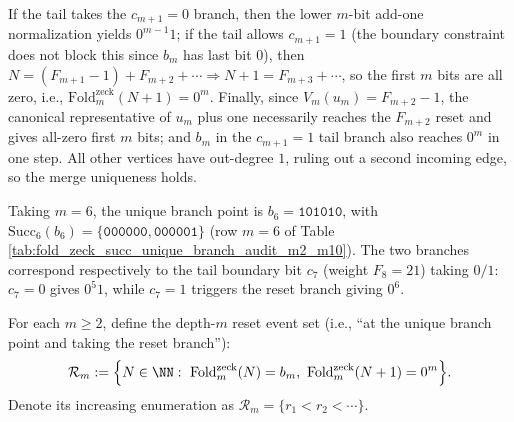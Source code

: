\begin{enumerate}
\begin{theorem}
  If the tail takes the \(c_{m+1}=0\) branch, then the lower \(m\)-bit add-one normalization yields \(0^{m-1}1\);
  if the tail allows \(c_{m+1}=1\) (the boundary constraint does not block this since \(b_m\) has last bit \(0\)), then
  \(N=(F_{m+1}-1)+F_{m+2}+\cdots\Rightarrow N+1=F_{m+3}+\cdots\), so the first \(m\) bits are all zero, i.e., \(\mathrm{Fold}^{\mathrm{zeck}}_m(N+1)=0^m\).
  Finally, since \(V_m(u_m)=F_{m+2}-1\), the canonical representative of \(u_m\) plus one necessarily reaches the \(F_{m+2}\) reset and gives all-zero first \(m\) bits; and \(b_m\) in the \(c_{m+1}=1\) tail branch also reaches \(0^m\) in one step. All other vertices have out-degree \(1\), ruling out a second incoming edge, so the merge uniqueness holds.
  \end{theorem}
  

  \begin{remark}\label{rem:terminal-succ-m6-specialization}
  Taking \(m=6\), the unique branch point is \(b_6=\texttt{101010}\), with
  \(\mathrm{Succ}_6(b_6)=\{\texttt{000000},\texttt{000001}\}\) (row \(m=6\) of Table \ref{tab:fold_zeck_succ_unique_branch_audit_m2_m10}).
  The two branches correspond respectively to the tail boundary bit \(c_7\) (weight \(F_8=21\)) taking \(0/1\): \(c_7=0\) gives \(0^{5}1\), while \(c_7=1\) triggers the reset branch giving \(0^6\).
  \end{remark}

  \begin{definition}\label{def:terminal-reset-events}
  For each \(m\ge 2\), define the depth-\(m\) reset event set (i.e., ``at the unique branch point and taking the reset branch''):
  \[
  \mathcal R_m
  :=\Bigl\{
  N\in\NN:\ \mathrm{Fold}^{\mathrm{zeck}}_m(N)=b_m,\ \mathrm{Fold}^{\mathrm{zeck}}_m(N+1)=0^m
  \Bigr\}.
  \]
  Denote its increasing enumeration as \(\mathcal R_m=\{r_1<r_2<\cdots\}\).
  \end{definition}


\end{enumerate}
